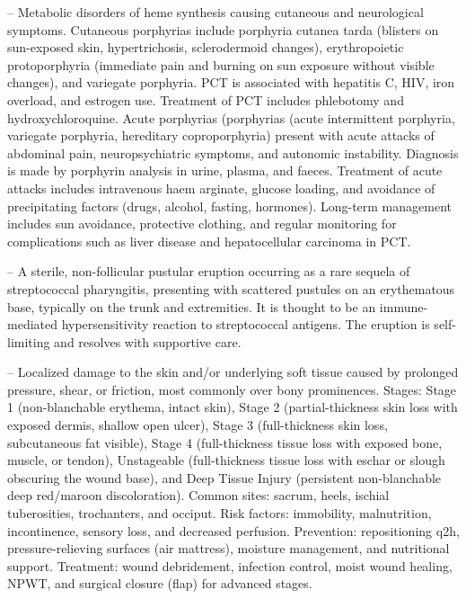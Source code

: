 -- Metabolic disorders of heme synthesis causing cutaneous and neurological symptoms. Cutaneous porphyrias include porphyria cutanea tarda (blisters on sun-exposed skin, hypertrichosis, sclerodermoid changes), erythropoietic protoporphyria (immediate pain and burning on sun exposure without visible changes), and variegate porphyria. PCT is associated with hepatitis C, HIV, iron overload, and estrogen use. Treatment of PCT includes phlebotomy and hydroxychloroquine. Acute porphyrias (porphyrias (acute intermittent porphyria, variegate porphyria, hereditary coproporphyria) present with acute attacks of abdominal pain, neuropsychiatric symptoms, and autonomic instability. Diagnosis is made by porphyrin analysis in urine, plasma, and faeces. Treatment of acute attacks includes intravenous haem arginate, glucose loading, and avoidance of precipitating factors (drugs, alcohol, fasting, hormones). Long-term management includes sun avoidance, protective clothing, and regular monitoring for complications such as liver disease and hepatocellular carcinoma in PCT.

-- A sterile, non-follicular pustular eruption occurring as a rare sequela of streptococcal pharyngitis, presenting with scattered pustules on an erythematous base, typically on the trunk and extremities. It is thought to be an immune-mediated hypersensitivity reaction to streptococcal antigens. The eruption is self-limiting and resolves with supportive care.

-- Localized damage to the skin and/or underlying soft tissue caused by prolonged pressure, shear, or friction, most commonly over bony prominences. Stages: Stage 1 (non-blanchable erythema, intact skin), Stage 2 (partial-thickness skin loss with exposed dermis, shallow open ulcer), Stage 3 (full-thickness skin loss, subcutaneous fat visible), Stage 4 (full-thickness tissue loss with exposed bone, muscle, or tendon), Unstageable (full-thickness tissue loss with eschar or slough obscuring the wound base), and Deep Tissue Injury (persistent non-blanchable deep red/maroon discoloration). Common sites: sacrum, heels, ischial tuberosities, trochanters, and occiput. Risk factors: immobility, malnutrition, incontinence, sensory loss, and decreased perfusion. Prevention: repositioning q2h, pressure-relieving surfaces (air mattress), moisture management, and nutritional support. Treatment: wound debridement, infection control, moist wound healing, NPWT, and surgical closure (flap) for advanced stages.

